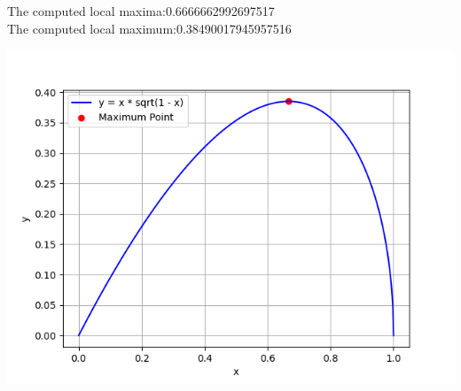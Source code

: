 \documentclass[journal]{IEEEtran}
\begin{document}
The computed local maxima:0.6666662992697517\\
The computed local maximum:0.38490017945957516\\
\begin{center}
    \includegraphics[width=0.75\columnwidth]{figs/fig22.png}
\end{center}
\end{document}
